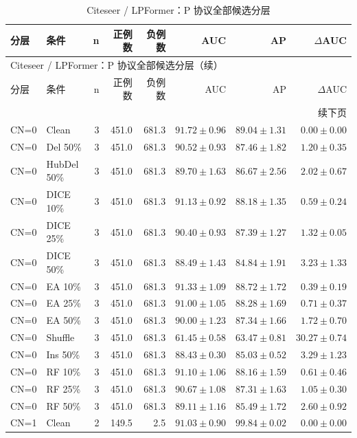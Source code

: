 {\footnotesize
\setlength{\tabcolsep}{3.2pt}
\renewcommand{\arraystretch}{1.10}
\begin{longtable}{llrrrrrr}
\caption{Citeseer / LPFormer：P 协议全部候选分层}\\
\toprule
分层 & 条件 & n & 正例数 & 负例数 & AUC & AP & $\Delta$AUC \\
\midrule
\endfirsthead
\multicolumn{8}{l}{Citeseer / LPFormer：P 协议全部候选分层（续）}\\
\toprule
分层 & 条件 & n & 正例数 & 负例数 & AUC & AP & $\Delta$AUC \\
\midrule
\endhead
\midrule\multicolumn{8}{r}{续下页}\\
\endfoot
\bottomrule
\endlastfoot
CN=0 & Clean & 3 & 451.0 & 681.3 & $91.72\pm0.96$ & $89.04\pm1.31$ & $0.00\pm0.00$ \\
CN=0 & Del 50\% & 3 & 451.0 & 681.3 & $90.52\pm0.93$ & $87.46\pm1.82$ & $1.20\pm0.35$ \\
CN=0 & HubDel 50\% & 3 & 451.0 & 681.3 & $89.70\pm1.63$ & $86.67\pm2.56$ & $2.02\pm0.67$ \\
CN=0 & DICE 10\% & 3 & 451.0 & 681.3 & $91.13\pm0.92$ & $88.18\pm1.35$ & $0.59\pm0.24$ \\
CN=0 & DICE 25\% & 3 & 451.0 & 681.3 & $90.40\pm0.93$ & $87.39\pm1.27$ & $1.32\pm0.05$ \\
CN=0 & DICE 50\% & 3 & 451.0 & 681.3 & $88.49\pm1.43$ & $84.84\pm1.91$ & $3.23\pm1.33$ \\
CN=0 & EA 10\% & 3 & 451.0 & 681.3 & $91.33\pm1.09$ & $88.72\pm1.72$ & $0.39\pm0.19$ \\
CN=0 & EA 25\% & 3 & 451.0 & 681.3 & $91.00\pm1.05$ & $88.28\pm1.69$ & $0.71\pm0.37$ \\
CN=0 & EA 50\% & 3 & 451.0 & 681.3 & $90.00\pm1.23$ & $87.34\pm1.66$ & $1.72\pm0.70$ \\
CN=0 & Shuffle & 3 & 451.0 & 681.3 & $61.45\pm0.58$ & $63.47\pm0.81$ & $30.27\pm0.74$ \\
CN=0 & Ins 50\% & 3 & 451.0 & 681.3 & $88.43\pm0.30$ & $85.03\pm0.52$ & $3.29\pm1.23$ \\
CN=0 & RF 10\% & 3 & 451.0 & 681.3 & $91.10\pm1.06$ & $88.16\pm1.59$ & $0.61\pm0.46$ \\
CN=0 & RF 25\% & 3 & 451.0 & 681.3 & $90.67\pm1.08$ & $87.31\pm1.63$ & $1.05\pm0.30$ \\
CN=0 & RF 50\% & 3 & 451.0 & 681.3 & $89.11\pm1.16$ & $85.49\pm1.72$ & $2.60\pm0.92$ \\
CN=1 & Clean & 2 & 149.5 & 2.5 & $91.03\pm0.90$ & $99.84\pm0.02$ & $0.00\pm0.00$ \\

\end{longtable}}
